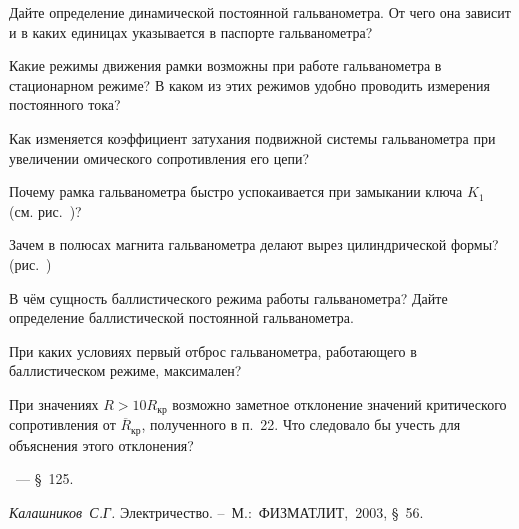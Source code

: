 \begin{lab:questions}
	\item Дайте определение динамической постоянной гальванометра. От чего она
зависит и в каких единицах указывается в паспорте гальванометра?

	\item Какие режимы движения рамки возможны при работе гальванометра в
стационарном режиме? В каком из этих режимов удобно проводить измерения
постоянного тока?

	\item Как изменяется коэффициент затухания подвижной системы гальванометра
при увеличении омического сопротивления его цепи?

	\item Почему рамка гальванометра быстро успокаивается при замыкании ключа
$K_1$ (см. рис.~)?

	\item Зачем в полюсах магнита гальванометра делают вырез цилиндрической
формы? (рис.~)

	\item В чём сущность баллистического режима работы гальванометра? Дайте
определение баллистической постоянной гальванометра.

	\item При каких условиях первый отброс гальванометра, работающего в
баллистическом режиме, максимален?

	\item При значениях $R>10R_{\text{кр}}$
возможно заметное отклонение значений критического сопротивления 
от $\overline R_{\text{кр}}$, полученного в п.~22. Что следовало бы учесть 
для объяснения этого отклонения?
\end{lab:questions}


\begin{lab:literature}
	\item \SivuhinIII~--- \S~125.

	\item \emph{Калашников~С.Г.} Электричество. --~М.:~ФИЗМАТЛИТ,~2003, \S~56.
\end{lab:literature}

